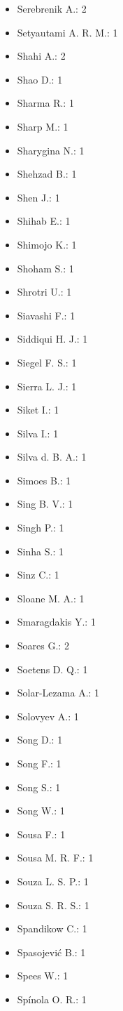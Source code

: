 \begin{itemize}
\item Serebrenik A.: 2
\item Setyautami A. R. M.: 1
\item Shahi A.: 2
\item Shao D.: 1
\item Sharma R.: 1
\item Sharp M.: 1
\item Sharygina N.: 1
\item Shehzad B.: 1
\item Shen J.: 1
\item Shihab E.: 1
\item Shimojo K.: 1
\item Shoham S.: 1
\item Shrotri U.: 1
\item Siavashi F.: 1
\item Siddiqui H. J.: 1
\item Siegel F. S.: 1
\item Sierra L. J.: 1
\item Siket I.: 1
\item Silva I.: 1
\item Silva d. B. A.: 1
\item Simoes B.: 1
\item Sing B. V.: 1
\item Singh P.: 1
\item Sinha S.: 1
\item Sinz C.: 1
\item Sloane M. A.: 1
\item Smaragdakis Y.: 1
\item Soares G.: 2
\item Soetens D. Q.: 1
\item Solar-Lezama A.: 1
\item Solovyev A.: 1
\item Song D.: 1
\item Song F.: 1
\item Song S.: 1
\item Song W.: 1
\item Sousa F.: 1
\item Sousa M. R. F.: 1
\item Souza L. S. P.: 1
\item Souza S. R. S.: 1
\item Spandikow C.: 1
\item Spasojevi\'{c} B.: 1
\item Spees W.: 1
\item Spínola O. R.: 1

\end{itemize}
